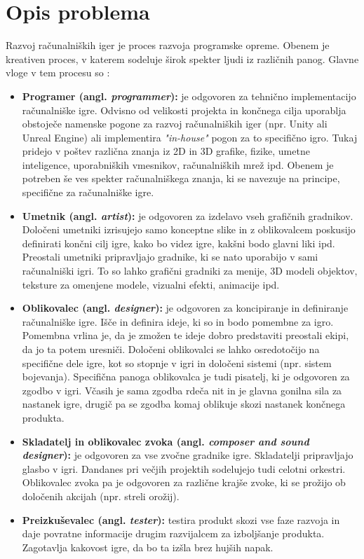 \documentclass[12pt,a4paper,twoside]{book}
\begin{document}
\section{Opis problema}
\label{sec:opis_problema}
Razvoj računalniških iger je proces razvoja programske opreme. Obenem je kreativen proces, v katerem sodeluje širok spekter ljudi iz različnih panog. Glavne vloge v tem procesu so \cite{rogers2014level}:
\begin{itemize}
	\item \textbf{Programer (angl. \textit{programmer}):} je odgovoren za tehnično implementacijo računalniške igre. Odvisno od velikosti projekta in končnega cilja uporablja obstoječe namenske pogone za razvoj računalniških iger (npr. Unity ali Unreal Engine) ali implementira \textit{"in-house"} pogon za to specifično igro. Tukaj pridejo v poštev različna znanja iz 2D in 3D grafike, fizike, umetne inteligence, uporabniških vmesnikov, računalniških mrež ipd. Obenem je potreben še ves spekter računalniškega znanja, ki se navezuje na principe, specifične za računalniške igre.
	\item \textbf{Umetnik (angl. \textit{artist}):} je odgovoren za izdelavo vseh grafičnih gradnikov. Določeni umetniki izrisujejo samo konceptne slike in z oblikovalcem poskusijo definirati končni cilj igre, kako bo videz igre, kakšni bodo glavni liki ipd. Preostali umetniki pripravljajo gradnike, ki se nato uporabijo v sami računalniški igri. To so lahko grafični gradniki za menije, 3D modeli objektov, teksture za omenjene modele, vizualni efekti, animacije ipd.
	\item \textbf{Oblikovalec (angl. \textit{designer}):} je odgovoren za koncipiranje in definiranje računalniške igre. Išče in definira ideje, ki so in bodo pomembne za igro. Pomembna vrlina je, da je zmožen te ideje dobro predstaviti preostali ekipi, da jo ta potem uresniči. Določeni oblikovalci se lahko osredotočijo na specifične dele igre, kot so stopnje v igri in določeni sistemi (npr. sistem bojevanja).
	Specifična panoga oblikovalca je tudi pisatelj, ki je odgovoren za zgodbo v igri. Včasih je sama zgodba rdeča nit in je glavna gonilna sila za nastanek igre, drugič pa se zgodba komaj oblikuje skozi nastanek končnega produkta.
	\item \textbf{Skladatelj in oblikovalec zvoka (angl. \textit{composer and sound designer}):} je odgovoren za vse zvočne gradnike igre. Skladatelji pripravljajo glasbo v igri. Dandanes pri večjih projektih sodelujejo tudi celotni orkestri. Oblikovalec zvoka pa je odgovoren za različne krajše zvoke, ki se prožijo ob določenih akcijah (npr. streli orožij).
	\item \textbf{Preizkuševalec (angl. \textit{tester}):} testira produkt skozi vse faze razvoja in daje povratne informacije drugim razvijalcem za izboljšanje produkta. Zagotavlja kakovost igre, da bo ta izšla brez hujših napak.
\end{itemize}
\end{document}
